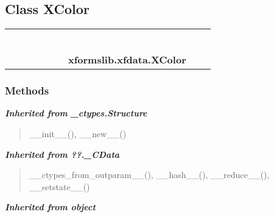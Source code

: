 \subsection{Class XColor}

    \label{xformslib:xfdata:XColor}
\begin{tabular}{cccccccccc}
\multicolumn{2}{r}{\settowidth{\BCL}{object}\multirow{2}{\BCL}{object}}
&&
&&
&&
  \\\cline{3-3}
  &&\multicolumn{1}{c|}{}
&&
&&
&&
  \\
\multicolumn{4}{r}{\settowidth{\BCL}{??.\_CData}\multirow{2}{\BCL}{??.\_CData}}
&&
&&
  \\\cline{5-5}
  &&&&\multicolumn{1}{c|}{}
&&
&&
  \\
\multicolumn{6}{r}{\settowidth{\BCL}{\_ctypes.Structure}\multirow{2}{\BCL}{\_ctypes.Structure}}
&&
  \\\cline{7-7}
  &&&&&&\multicolumn{1}{c|}{}
&&
  \\
&&&&&&\multicolumn{2}{l}{\textbf{xformslib.xfdata.XColor}}
\end{tabular}



  \subsubsection{Methods}


\large{\textbf{\textit{Inherited from \_ctypes.Structure}}}

\begin{quote}
\_\_init\_\_(), \_\_new\_\_()
\end{quote}

\large{\textbf{\textit{Inherited from ??.\_CData}}}

\begin{quote}
\_\_ctypes\_from\_outparam\_\_(), \_\_hash\_\_(), \_\_reduce\_\_(), \_\_setstate\_\_()
\end{quote}

\large{\textbf{\textit{Inherited from object}}}

